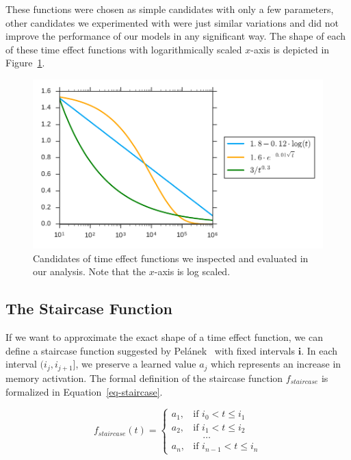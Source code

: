 These functions were chosen as simple candidates with only a few parameters, other candidates we experimented with were just similar variations and did not improve the performance of our models in any significant way. The shape of each of these time effect functions with logarithmically scaled $x$-axis is depicted in Figure~\ref{fig-time-effect-functions}.

\begin{figure}[htbp]
  \centering
  \includegraphics[width=\textwidth]{img/time-effect-functions}
  \caption{Candidates of time effect functions we inspected and evaluated in our analysis. Note that the $x$-axis is log scaled.}
  \label{fig-time-effect-functions}
\end{figure}

\subsection{The Staircase Function}
\label{staircase-function}

If we want to approximate the exact shape of a time effect function, we can define a staircase function suggested by Pelánek~\cite{Pelanek2015} with fixed intervals $\mathbf{i}$. In each interval $(i_j, i_{j+1}]$, we preserve a learned value $a_j$ which represents an increase in memory activation. The formal definition of the staircase function $f_{\mathit{staircase}}$ is formalized in Equation~\ref{eq-staircase}.

\begin{equation} \label{eq-staircase}
  f_{\mathit{staircase}}(t) = \begin{cases}
            a_1, & \text{if } i_0 < t \leq i_1 \\
            a_2, & \text{if } i_1 < t \leq i_2 \\
                 & \hspace{1em} \dots \\
            a_n, & \text{if } i_{n-1} < t \leq i_n
         \end{cases}
\end{equation}

